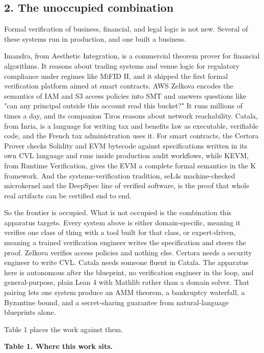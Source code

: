 \documentclass[
  11pt,
]{article}
\renewcommand{\_}{\origunderscore\allowbreak}
\begin{document}
\subsection{2. The unoccupied
combination}\label{2-the-unoccupied-combination}

Formal verification of business, financial, and legal logic is not new.
Several of these systems run in production, and one built a business.

Imandra, from Aesthetic Integration, is a commercial theorem prover for
financial algorithms. It reasons about trading systems and venue logic
for regulatory compliance under regimes like MiFID II, and it shipped
the first formal verification platform aimed at smart contracts. AWS
Zelkova encodes the semantics of IAM and S3 access policies into SMT and
answers questions like "can any principal outside this account read this
bucket?" It runs millions of times a day, and its companion Tiros
reasons about network reachability. Catala, from Inria, is a language
for writing tax and benefits law as executable, verifiable code, and the
French tax administration uses it. For smart contracts, the Certora
Prover checks Solidity and EVM bytecode against specifications written
in its own CVL language and runs inside production audit workflows,
while KEVM, from Runtime Verification, gives the EVM a complete formal
semantics in the K framework. And the systems-verification tradition,
seL4\textquotesingle s machine-checked microkernel and the DeepSpec line
of verified software, is the proof that whole real artifacts can be
certified end to end.

So the frontier is occupied. What is not occupied is the combination
this apparatus targets. Every system above is either domain-specific,
meaning it verifies one class of thing with a tool built for that class,
or expert-driven, meaning a trained verification engineer writes the
specification and steers the proof. Zelkova verifies access policies and
nothing else. Certora needs a security engineer to write CVL. Catala
needs someone fluent in Catala. The apparatus here is autonomous after
the blueprint, no verification engineer in the loop, and
general-purpose, plain Lean 4 with Mathlib rather than a domain solver.
That pairing lets one system produce an AMM theorem, a bankruptcy
waterfall, a Byzantine bound, and a secret-sharing guarantee from
natural-language blueprints alone.

Table 1 places the work against them.

\textbf{Table 1. Where this work sits.}
\end{document}
